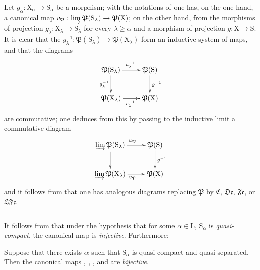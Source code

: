 \begin{env}[8.3.10]
\label{IV.8.3.10}
Let $g_\alpha:\mathrm{X}_\alpha\to\mathrm{S}_\alpha$ be a morphism; with the notations of  one has, on the one hand, a canonical map $v_\mathfrak{P}:\varinjlim\mathfrak{P}(\mathrm{S}_\lambda)\to\mathfrak{P}(\mathrm{X})$; on the other hand, from the morphisms of projection $g_\lambda:\mathrm{X}_\lambda\to\mathrm{S}_\lambda$ for every $\lambda\geqslant\alpha$ and a morphism of projection $g:\mathrm{X}\to\mathrm{S}$.
It is clear that the $g_\lambda^{-1}:\mathfrak{P}(\mathrm{S}_\lambda)\to\mathfrak{P}(\mathrm{X}_\lambda)$ form an inductive system of maps, and that the diagrams
\[
\xymatrix{
  \mathfrak{P}(\mathrm{S}_\lambda) \ar[r]^{u_\lambda^{-1}} \ar[d]_{g_\lambda^{-1}} & \mathfrak{P}(\mathrm{S}) \ar[d]^{g^{-1}} \\
  \mathfrak{P}(\mathrm{X}_\lambda) \ar[r]_{v_\lambda^{-1}} & \mathfrak{P}(\mathrm{X})
}
\]
are commutative; one deduces from this by passing to the inductive limit a commutative diagram
\[
\xymatrix{
  \varinjlim\mathfrak{P}(\mathrm{S}_\lambda) \ar[r]^{u_\mathfrak{P}} \ar[d] & \mathfrak{P}(\mathrm{S}) \ar[d]^{g^{-1}} \\
  \varinjlim\mathfrak{P}(\mathrm{X}_\lambda) \ar[r]_{v_\mathfrak{P}} & \mathfrak{P}(\mathrm{X})
}
\]
and it follows from  that one has analogous diagrams replacing $\mathfrak{P}$ by $\mathfrak{C}$, $\mathfrak{Dc}$, $\mathfrak{Fc}$, or $\mathfrak{LFc}$.

\begin{equation}
  \tag{8.3.10.1}
\end{equation}
\end{env}

It follows from  that under the hypothesis that for some $\alpha\in\mathrm{L}$, $\mathrm{S}_\alpha$ is \emph{quasi-compact}, the canonical map  is \emph{injective}.
Furthermore:

\begin{theorem}[8.3.11]
\label{IV.8.3.11}
Suppose that there exists $\alpha$ such that $\mathrm{S}_\alpha$ is quasi-compact and quasi-separated.
Then the canonical maps , , , and  are \emph{bijective}.
\end{theorem}

